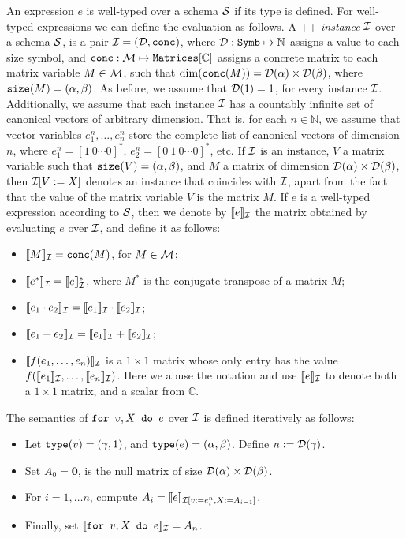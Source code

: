 An expression $e$ is well-typed over a schema $\mathcal{S}$ if its type is defined. For well-typed expressions we can define the evaluation as follows.
%
A \lang++ {\em instance} $\mathcal{I}$ over a schema $\mathcal{S}$, is a pair $\mathcal{I} = (\mathcal{D},\texttt{conc})$, where $\mathcal{D} : \texttt{Symb} \mapsto \mathbb{N}$ assigns a value to each size symbol, and $\texttt{conc} : \mathcal{M} \mapsto \texttt{Matrices}[\mathbb{C}]$ assigns a concrete matrix to each matrix variable $M\in \mathcal{M}$, such that $\dim(\texttt{conc}(M)) = \mathcal{D}(\alpha)\times \mathcal{D}(\beta)$, where $\texttt{size}(M) = (\alpha,\beta)$. As before, we assume that $\mathcal{D}(1) = 1$, for every instance $\mathcal{I}$. Additionally, we assume that each instance $\mathcal{I}$ has a countably infinite set of canonical vectors of arbitrary dimension. That is, for each $n\in \mathbb{N}$, we assume that vector variables $e_1^n,\ldots ,e_n^n$ store the complete list of canonical vectors of dimension $n$, where $e_1^n = [1\ 0 \cdots 0]^*$, $e_2^n = [0\ 1\ 0 \cdots 0]^*$, etc.
If $\mathcal{I}$ is an instance, $V$ a matrix variable such that $\texttt{size}(V)= (\alpha,\beta)$, and $M$ a matrix of dimension $\mathcal{D}(\alpha)\times \mathcal{D}(\beta)$, then $\mathcal{I}[V := X]$ denotes an instance that coincides with $\mathcal{I}$, apart from the fact that the value of the matrix variable $V$ is the matrix $M$. 
If $e$ is a well-typed expression according to $\mathcal{S}$, then we denote by $\llbracket e \rrbracket_{\mathcal{I}}$ the matrix obtained by evaluating $e$ over $\mathcal{I}$, and define it as follows:
\begin{itemize}
\item $\llbracket M \rrbracket_{\mathcal{I}} = \texttt{conc}(M)$, for $M\in \mathcal{M}$;
\item $\llbracket e^* \rrbracket_{\mathcal{I}} = \llbracket e \rrbracket_{\mathcal{I}}^*$, where $M^*$ is the conjugate transpose of a matrix $M$;
\item $\llbracket e_1\cdot e_2 \rrbracket_{\mathcal{I}} = \llbracket e_1 \rrbracket_{\mathcal{I}} \cdot \llbracket e_2 \rrbracket_{\mathcal{I}}$;
\item $\llbracket e_1 + e_2 \rrbracket_{\mathcal{I}} = \llbracket e_1 \rrbracket_{\mathcal{I}} + \llbracket e_2 \rrbracket_{\mathcal{I}}$;
\item $\llbracket f(e_1,\ldots ,e_n) \rrbracket_{\mathcal{I}}$ is a $1\times 1$ matrix whose only entry has the value $f(\llbracket e_1 \rrbracket_{\mathcal{I}},\ldots ,\llbracket e_n \rrbracket_{\mathcal{I}})$. Here we abuse the notation and use $\llbracket e \rrbracket_{\mathcal{I}}$ to denote both a $1\times 1$ matrix, and a scalar from $\mathbb{C}$.
\end{itemize}

The semantics of $\texttt{for }v,X \texttt{ do }e$ over $\mathcal{I}$ is defined iteratively as follows:
\begin{itemize}
\item Let $\texttt{type}(v)= (\gamma,1)$, and $\texttt{type}(e) = (\alpha,\beta)$. Define $n := \mathcal{D}(\gamma)$.
\item Set $A_0 = \mathbf{0}$, is the null matrix of size $\mathcal{D}(\alpha)\times \mathcal{D}(\beta)$.
\item For $i=1,\ldots n$, compute $A_i = \llbracket e \rrbracket_{\mathcal{I}[v := e^{n}_i, X:= A_{i-1}]}$.
\item Finally, set $\llbracket \texttt{for }v,X \texttt{ do }e \rrbracket_{\mathcal{I}} = A_{n}$.
\end{itemize}


